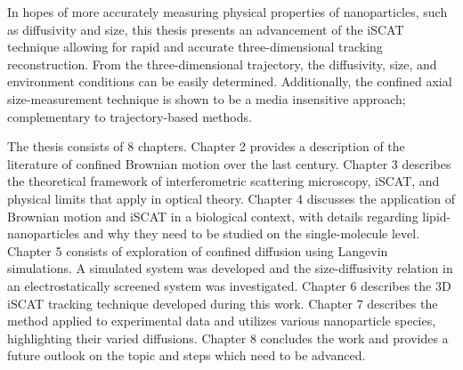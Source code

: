 In hopes of more accurately measuring physical properties of nanoparticles, such as diffusivity and size, this thesis presents an advancement of the iSCAT technique allowing for rapid and accurate three-dimensional tracking reconstruction. From the three-dimensional trajectory, the diffusivity, size, and environment conditions can be easily determined. Additionally, the confined axial size-measurement technique is shown to be a media insensitive approach; complementary to trajectory-based methods.

The thesis consists of 8 chapters. Chapter 2 provides a description of the literature of confined Brownian motion over the last century. Chapter 3 describes the theoretical framework of interferometric scattering microscopy, iSCAT, and physical limits that apply in optical theory. Chapter 4 discusses the application of Brownian motion and iSCAT in a biological context, with details regarding lipid-nanoparticles and why they need to be studied on the single-molecule level. Chapter 5 consists of exploration of confined diffusion using Langevin simulations. A simulated system was developed and the size-diffusivity relation in an electrostatically screened system was investigated. Chapter 6 describes the 3D iSCAT tracking technique developed during this work. Chapter 7 describes the method applied to experimental data and utilizes various nanoparticle species, highlighting their varied diffusions. Chapter 8 concludes the work and provides a future outlook on the topic and steps which need to be advanced.


